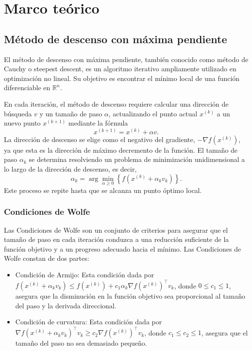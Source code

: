\chapter{Marco teórico}

\section{Método de descenso con máxima pendiente}

El método de descenso con máxima pendiente, también conocido como método de Cauchy o steepest descent, es un algoritmo iterativo ampliamente utilizado en optimización no lineal. Su objetivo es encontrar el mínimo local de una función diferenciable en $\mathbb{R}^n$.

En cada iteración, el método de descenso requiere calcular una dirección de búsqueda $v$ y un tamaño de paso $\alpha$, actualizando el punto actual $x^{(k)}$ a un nuevo punto $x^{(k + 1)}$ mediante la fórmula
$$x^{(k + 1)} = x^{(k)} + \alpha v.$$
La dirección de descenso se elige como el negativo del gradiente, $-\nabla f\left(x^{(k)}\right)$, ya que esta es la dirección de máximo decremento de la función. El tamaño de paso $\alpha_k$ se determina resolviendo un problema de minimización unidimensional a lo largo de la dirección de descenso, es decir,
$$\alpha_k = \arg \min_{\alpha \geq 0} \left\{f\left(x^{(k)} + \alpha_k v_k\right)\right\}.$$
Este proceso se repite hasta que se alcanza un punto óptimo local.

\subsection{Condiciones de Wolfe}

Las Condiciones de Wolfe son un conjunto de criterios para asegurar que el tamaño de paso en cada iteración conduzca a una reducción suficiente de la función objetivo y a un progreso adecuado hacia el mínimo. Las Condiciones de Wolfe constan de dos partes:
\begin{itemize}
    \item Condición de Armijo: Esta condición dada por $f\left(x^{(k)} + \alpha_k v_k\right) \leq f\left(x^{(k)}\right) + c_1 \alpha_k \nabla f\left(x^{(k)}\right)^{\top} v_k$, donde $0 \leq c_1 \leq 1$, asegura que la disminución en la función objetivo sea proporcional al tamaño del paso y la derivada direccional.
    \item Condición de curvatura: Esta condición dada por $\nabla f\left(x^{(k)} + \alpha_k v_k\right)^{\top} v_k \geq c_2 \nabla f\left(x^{(k)}\right)^{\top} v_k$, donde $c_1 \leq c_2 \leq 1$, asegura que el tamaño del paso no sea demasiado pequeño. 
\end{itemize}

